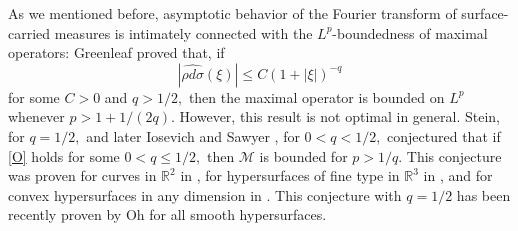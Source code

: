 \documentclass[a4paper, 11pt]{article}
\theoremstyle{plain}
\theoremstyle{definition}
\theoremstyle{lemma}
\theoremstyle{Remark}
\theoremstyle{proposition}
\theoremstyle{corollary}
\theoremstyle{example}
\theoremstyle{assumption}
\begin{document}
As we mentioned before, asymptotic behavior of the Fourier transform of  surface-carried measures is intimately connected with the   $L^p$-boundedness  of  maximal  operators:  Greenleaf \cite{Gr}  proved that, if
\begin{equation}\label{O}|\widehat{\rho d\sigma}(\xi)|\le C(1+|\xi|)^{-q}
\end{equation}
for some $C>0$ and  $q>1/2,$ then the maximal operator is bounded on $L^p$ whenever $p>1+1/(2q).$ However, this result is not optimal in general.  Stein, for $q=1/2,$ and later Iosevich  and  Sawyer \cite{I.S}, for $0<q<1/2,$ conjectured that if \eqref{O} holds for some $0<q\leq 1/2,$ then  $\mathcal{M}$ is bounded for $p>1/q.$ This conjecture was proven for curves in $\mathbb{R}^2$ in \cite{Io}, for hypersurfaces of fine type in $\mathbb{R}^3$ in \cite{I.K.M},  and for convex hypersurfaces in any dimension in \cite{I.U}.  This conjecture with $q=1/2$ has been recently proven by Oh \cite{Oh} for all smooth hypersurfaces.
\end{document}
